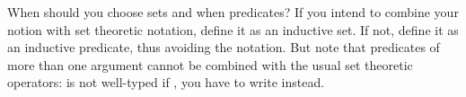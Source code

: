 \begin{isabellebody}
\begin{isamarkuptext}
When should you choose sets and when predicates? If you intend to combine your notion with set theoretic notation, define it as an inductive set. If not, define it as an inductive predicate, thus avoiding the  notation. But note that predicates of more than one argument cannot be combined with the usual set theoretic operators:  is not well-typed if , you have to write  instead.
%
\end{isamarkuptext}%
\isamarkuptrue%
%
\isadelimtheory
%
\endisadelimtheory
%
\isatagtheory
%
\endisatagtheory
{\isafoldtheory}%
%
\isadelimtheory
%
\endisadelimtheory
\end{isabellebody}%
